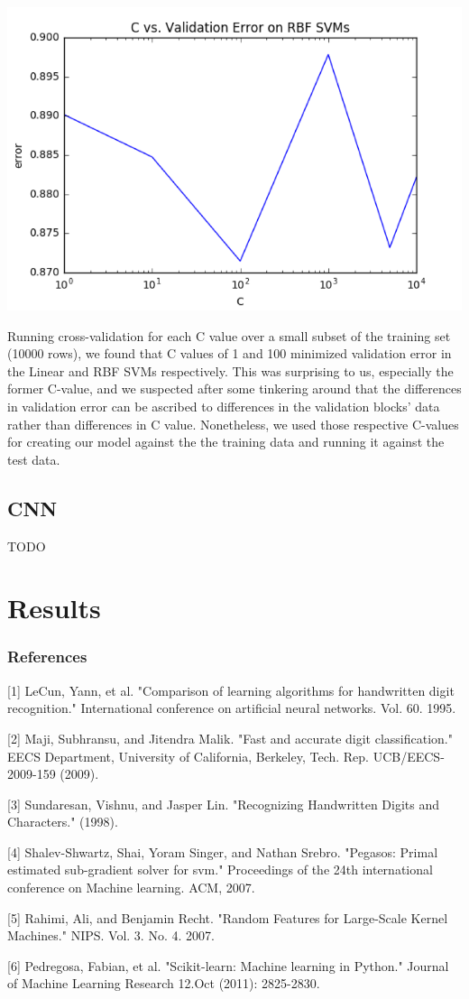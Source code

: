 \documentclass{article} %
\begin{document}
\includegraphics[width=\textwidth]{sklearn-svm-kernel-c-cv.png}

Running cross-validation for each C value over a small subset of
the training set (10000 rows), we found that C values of 1 and 100
minimized validation error in the Linear and RBF SVMs respectively.
This was surprising to us, especially the former C-value, and we
suspected after some tinkering around that the differences in
validation error can be ascribed to differences in the validation
blocks’ data rather than differences in C value. Nonetheless, we
used those respective C-values for creating our model against the
the training data and running it against the test data. 


\subsection{CNN}
TODO

\section{Results}

\subsubsection*{References}

\small{
  [1] LeCun, Yann, et al. "Comparison of learning algorithms for handwritten
  digit recognition." International conference on artificial neural networks.
  Vol. 60. 1995.	

  [2] Maji, Subhransu, and Jitendra Malik. "Fast and accurate digit
  classification." EECS Department, University of California,
  Berkeley, Tech. Rep. UCB/EECS-2009-159 (2009).

  [3] Sundaresan, Vishnu, and Jasper Lin. "Recognizing Handwritten Digits and
  Characters." (1998).

  [4] Shalev-Shwartz, Shai, Yoram Singer, and Nathan Srebro. "Pegasos: Primal
  estimated sub-gradient solver for svm." Proceedings of the 24th international
  conference on Machine learning. ACM, 2007.

  [5] Rahimi, Ali, and Benjamin Recht. "Random Features for Large-Scale Kernel
  Machines." NIPS. Vol. 3. No. 4. 2007.

  [6] Pedregosa, Fabian, et al. "Scikit-learn: Machine learning in Python."
  Journal of Machine Learning Research 12.Oct (2011): 2825-2830.
}
\end{document}
